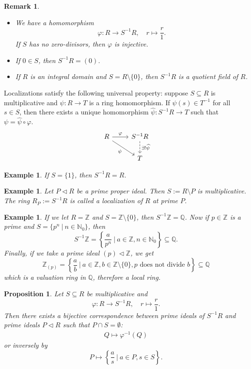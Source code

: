 \documentclass[10pt, a4paper]{article}
\newtheorem{proposition}[thm]{Proposition}
\newtheorem*{remark}{Remark}
\newtheorem{example}[thm]{Example}
\newcommand{\N}{\mathbb {N}}
\newcommand{\Z}{\mathbb {Z}}
\newcommand{\Q}{\mathbb {Q}}
\begin{document}
\begin{remark}
  \begin{itemize}
    \item We have a homomorphism $$\varphi: R \to S^{-1} R,\quad r \mapsto \frac{r}{1}.$$
    If $S$ has no zero-divisors, then $\varphi$ is injective.
    \item If $0 \in S$, then $S^{-1} R = (0)$.
    \item If $R$ is an integral domain and $S = R \setminus \{0\}$, then $S^{-1} R$ is a quotient field of $R$.
  \end{itemize}
\end{remark}

Localizations satisfy the following universal property: suppose $S \subseteq R$ is multiplicative
and $\psi: R \to T$ is a ring homomorphism. If $\psi (s) \in T^{-1}$ for all $s \in S$,
then there exists a unique homomorphism 
$\widehat{\psi}: S^{-1} R \to T$ such that $\psi = \widehat{\psi} \circ \varphi$.
\[\begin{tikzcd}
	R & {S^{-1}R} \\
	& T
	\arrow["\psi"', from=1-1, to=2-2]
	\arrow["\varphi", from=1-1, to=1-2]
	\arrow["{\exists!\widehat{\psi}}", dashed, from=1-2, to=2-2]
\end{tikzcd}\]

\begin{example}
  If $S = \{1\}$, then $S^{-1} R = R$.
\end{example}

\begin{example}
  Let $P \lhd R$ be a prime proper ideal. Then $S := R \setminus P$ is multiplicative.
  The ring $R_P := S^{-1} R$ is called a localization of $R$ at prime $P$.
\end{example}

\begin{example}
  If we let $R = \Z$ and $S = \Z \setminus \{0\}$, then $S^{-1} \Z = \Q$.
  Now if $p \in \Z$ is a prime and $S = \{p^n\ |\ n \in \N_0\}$, then 
  $$S^{-1} \Z = \left\lbrace \frac{a}{p^n}\ |\ a \in \Z, n \in \N_0\right\rbrace \subseteq \Q.$$
  Finally, if we take a prime ideal $(p) \lhd \Z$, we get 
  $$\Z_{(p)} = \left\lbrace \frac{a}{b}\ |\ a \in \Z, b \in \Z \setminus \{0\}, \textrm{$p$ does not divide $b$}\right\rbrace \subseteq \Q$$
  which is a valuation ring in $\Q$, therefore a local ring.
\end{example}

\begin{proposition}
  Let $S \subseteq R$ be multiplicative and 
  $$\varphi: R \to S^{-1} R,\quad r \mapsto \frac{r}{1}.$$
  Then there exists a bijective correspondence between prime ideals of $S^{-1} R$ and prime ideals $P \lhd R$ such that $P \cap S = \emptyset$:
  \begin{align*}
    Q \mapsto \varphi^{-1} (Q)
  \end{align*}
  or inversely by $$P \mapsto \left\lbrace \frac{a}{s}\ |\ a \in P, s \in S\right\rbrace.$$
\end{proposition}
\end{document}
